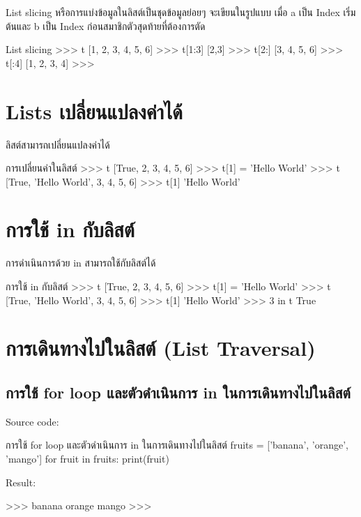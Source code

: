List slicing หรือการแบ่งข้อมูลในลิสต์เป็นชุดข้อมูลย่อยๆ จะเขียนในรูปแบบ  \pyinline{[a:b]} เมื่อ a เป็น Index เริ่มต้นและ b เป็น Index ก่อนสมาชิกตัวสุดท้ายที่ต้องการตัด

\begin{codelist}{List slicing}{}
>>> t
[1, 2, 3, 4, 5, 6]
>>> t[1:3]
[2,3]
>>> t[2:]
[3, 4, 5, 6]
>>> t[:4]
[1, 2, 3, 4]
>>>
\end{codelist}

\section{Lists เปลี่ยนแปลงค่าได้}
ลิสต์สามารถเปลี่ยนแปลงค่าได้ 

\begin{codelist}{การเปลี่ยนค่าในลิสต์}{}
>>> t
[True, 2, 3, 4, 5, 6]
>>> t[1] = 'Hello World'
>>> t
[True, 'Hello World', 3, 4, 5, 6]
>>> t[1]
'Hello World'
\end{codelist}


\section{การใช้ in กับลิสต์}

การดำเนินการด้วย in สามารถใช้กับลิสต์ได้ 

\begin{codelist}{การใช้ in กับลิสต์}{}
>>> t
[True, 2, 3, 4, 5, 6]
>>> t[1] = 'Hello World'
>>> t
[True, 'Hello World', 3, 4, 5, 6]
>>> t[1]
'Hello World'
>>> 3 in t
True
\end{codelist}


\section{การเดินทางไปในลิสต์ (List Traversal)}
\subsection{การใช้ for loop และตัวดำเนินการ in ในการเดินทางไปในลิสต์ }

Source code:
\begin{codelist}{การใช้ for loop และตัวดำเนินการ in ในการเดินทางไปในลิสต์}{}
fruits = ['banana', 'orange', 'mango']
for fruit in fruits: print(fruit)
\end{codelist}

Result:
\begin{codelist}{}{}
>>>
banana
orange
mango
>>>
\end{codelist}

